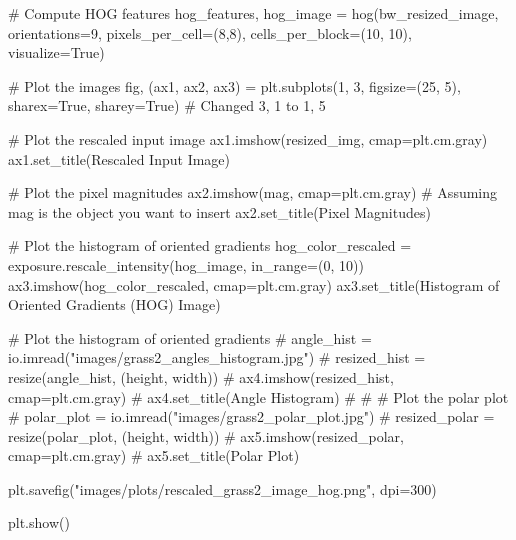 \documentclass[
  letterpaper,
  DIV=11,
  numbers=noendperiod]{scrreprt}
\newenvironment{Shaded}{\begin{snugshade}}{\end{snugshade}}
\newcommand{\CommentTok}[1]{\textcolor[rgb]{0.37,0.37,0.37}{#1}}
\newcommand{\DecValTok}[1]{\textcolor[rgb]{0.68,0.00,0.00}{#1}}
\newcommand{\NormalTok}[1]{\textcolor[rgb]{0.00,0.23,0.31}{#1}}
\newcommand{\OperatorTok}[1]{\textcolor[rgb]{0.37,0.37,0.37}{#1}}
\newcommand{\StringTok}[1]{\textcolor[rgb]{0.13,0.47,0.30}{#1}}
\newcommand{\VariableTok}[1]{\textcolor[rgb]{0.07,0.07,0.07}{#1}}
\begin{document}
\begin{Shaded}
\begin{Highlighting}[]
\CommentTok{\# Compute HOG features}
\NormalTok{hog\_features, hog\_image }\OperatorTok{=}\NormalTok{ hog(bw\_resized\_image, orientations}\OperatorTok{=}\DecValTok{9}\NormalTok{, pixels\_per\_cell}\OperatorTok{=}\NormalTok{(}\DecValTok{8}\NormalTok{,}\DecValTok{8}\NormalTok{),}
\NormalTok{                              cells\_per\_block}\OperatorTok{=}\NormalTok{(}\DecValTok{10}\NormalTok{, }\DecValTok{10}\NormalTok{), visualize}\OperatorTok{=}\VariableTok{True}\NormalTok{)}

\CommentTok{\# Plot the images}
\NormalTok{fig, (ax1, ax2, ax3) }\OperatorTok{=}\NormalTok{ plt.subplots(}\DecValTok{1}\NormalTok{, }\DecValTok{3}\NormalTok{, figsize}\OperatorTok{=}\NormalTok{(}\DecValTok{25}\NormalTok{, }\DecValTok{5}\NormalTok{), sharex}\OperatorTok{=}\VariableTok{True}\NormalTok{, sharey}\OperatorTok{=}\VariableTok{True}\NormalTok{)  }\CommentTok{\# Changed 3, 1 to 1, 5}

\CommentTok{\# Plot the rescaled input image}
\NormalTok{ax1.imshow(resized\_img, cmap}\OperatorTok{=}\NormalTok{plt.cm.gray)}
\NormalTok{ax1.set\_title(}\StringTok{\textquotesingle{}Rescaled Input Image\textquotesingle{}}\NormalTok{)}

\CommentTok{\# Plot the pixel magnitudes}
\NormalTok{ax2.imshow(mag, cmap}\OperatorTok{=}\NormalTok{plt.cm.gray)  }\CommentTok{\# Assuming mag is the object you want to insert}
\NormalTok{ax2.set\_title(}\StringTok{\textquotesingle{}Pixel Magnitudes\textquotesingle{}}\NormalTok{)}

\CommentTok{\# Plot the histogram of oriented gradients}
\NormalTok{hog\_color\_rescaled }\OperatorTok{=}\NormalTok{ exposure.rescale\_intensity(hog\_image, in\_range}\OperatorTok{=}\NormalTok{(}\DecValTok{0}\NormalTok{, }\DecValTok{10}\NormalTok{))}
\NormalTok{ax3.imshow(hog\_color\_rescaled, cmap}\OperatorTok{=}\NormalTok{plt.cm.gray)}
\NormalTok{ax3.set\_title(}\StringTok{\textquotesingle{}Histogram of Oriented Gradients (HOG) Image\textquotesingle{}}\NormalTok{)}

\CommentTok{\# Plot the histogram of oriented gradients}
\CommentTok{\# angle\_hist = io.imread("images/grass2\_angles\_histogram.jpg")}
\CommentTok{\# resized\_hist = resize(angle\_hist, (height, width))}
\CommentTok{\# ax4.imshow(resized\_hist, cmap=plt.cm.gray)}
\CommentTok{\# ax4.set\_title(\textquotesingle{}Angle Histogram\textquotesingle{})}
\CommentTok{\# }
\CommentTok{\# \# Plot the polar plot}
\CommentTok{\# polar\_plot = io.imread("images/grass2\_polar\_plot.jpg")}
\CommentTok{\# resized\_polar = resize(polar\_plot, (height, width))}
\CommentTok{\# ax5.imshow(resized\_polar, cmap=plt.cm.gray)}
\CommentTok{\# ax5.set\_title(\textquotesingle{}Polar Plot\textquotesingle{})}

\NormalTok{plt.savefig(}\StringTok{"images/plots/rescaled\_grass2\_image\_hog.png"}\NormalTok{, dpi}\OperatorTok{=}\DecValTok{300}\NormalTok{)}

\NormalTok{plt.show()}
\end{Highlighting}
\end{Shaded}
\end{document}
